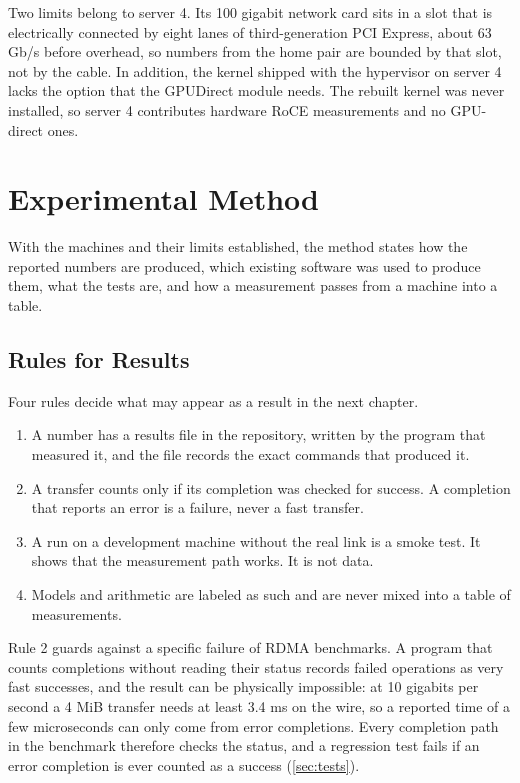 Two limits belong to server 4. Its 100 gigabit network card sits in a slot
that is electrically connected by eight lanes of third-generation PCI
Express, about 63 Gb/s before overhead, so numbers from the home pair are
bounded by that slot, not by the cable. In addition, the kernel shipped with
the hypervisor on server 4 lacks the option that the GPUDirect module needs.
The rebuilt kernel was never installed, so server 4 contributes hardware RoCE
measurements and no GPU-direct ones.

\section{Experimental Method}
\label{ch:method}

With the machines and their limits established, the method states how the
reported numbers are produced, which existing software was used to produce
them, what the tests are, and how a measurement passes from a machine into a
table.

\subsection{Rules for Results}
\label{sec:rules}

Four rules decide what may appear as a result in the next chapter.

\begin{enumerate}
  \item A number has a results file in the repository, written by the program
        that measured it, and the file records the exact commands that
        produced it.
  \item A transfer counts only if its completion was checked for success. A
        completion that reports an error is a failure, never a fast transfer.
  \item A run on a development machine without the real link is a smoke test.
        It shows that the measurement path works. It is not data.
  \item Models and arithmetic are labeled as such and are never mixed into a
        table of measurements.
\end{enumerate}

Rule 2 guards against a specific failure of RDMA benchmarks. A program that counts completions without reading their status records failed operations as very fast successes, and the result can be physically impossible: at 10 gigabits per second a 4 MiB transfer needs at least 3.4 ms on the wire, so a reported time of a few microseconds can only come from error completions. Every completion path in the benchmark therefore checks the status, and a regression test fails if an error completion is ever counted as a success (\cref{sec:tests}).

